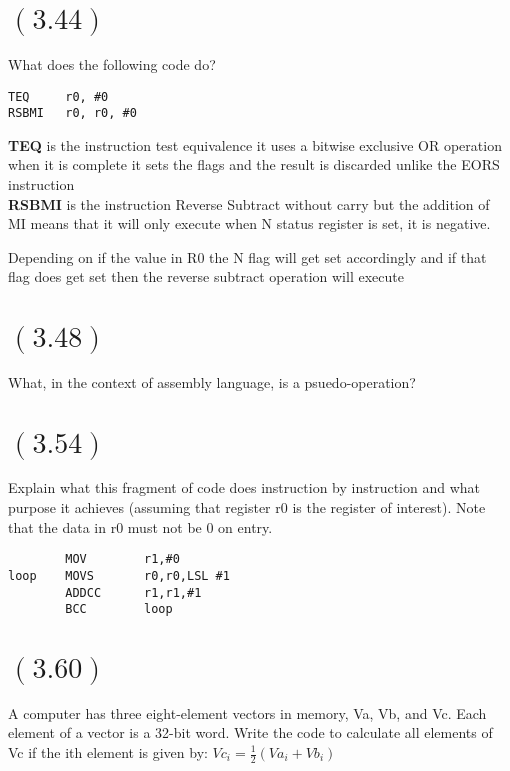 \documentclass[letterpaper,12pt,titlepage]{article}
\begin{document}
\begin{mdframed}[style=MyFrame]
\end{mdframed}

\section*{$(3.44)$} What does the following code do?
\begin{verbatim}
TEQ     r0, #0
RSBMI   r0, r0, #0
\end{verbatim}

\begin{mdframed}[style=MyFrame]
\textbf{TEQ} is the instruction test equivalence it uses a bitwise exclusive OR operation when it is complete it sets the flags and the result is discarded unlike the EORS instruction\\
\textbf{RSBMI} is the instruction Reverse Subtract without carry but the addition of MI means that it will only execute when N status register is set, it is negative. 

Depending on if the value in R0 the N flag will get set accordingly and if that flag does get set then the reverse subtract operation will execute 
\end{mdframed}

\section*{$(3.48)$} What, in the context of assembly language, is a psuedo-operation?

\begin{mdframed}[style=MyFrame]
\end{mdframed}

\section*{$(3.54)$} Explain what this fragment of code does instruction by instruction and what purpose it achieves (assuming that register r0 is the register of interest). Note that the data in r0 must not be 0 on entry.
\begin{verbatim}
        MOV        r1,#0
loop    MOVS       r0,r0,LSL #1
        ADDCC      r1,r1,#1
        BCC        loop
\end{verbatim}

\begin{mdframed}[style=MyFrame]
\end{mdframed}

\newpage
\section*{$(3.60)$} A computer has three eight-element vectors in memory, Va, Vb, and Vc. Each element of a vector is a 32-bit word. Write the code to calculate all elements of Vc if the ith element is given by: $Vc_i = \frac{1}{2} ( Va_i + Vb_i)$
\begin{mdframed}[style=MyFrame]

\end{mdframed}
\newpage
\end{document}
